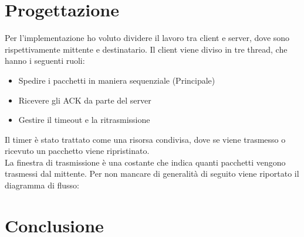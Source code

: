 \documentclass[a4paper,12pt]{report}
\begin{document}
\chapter{Progettazione}
Per l'implementazione ho voluto dividere il lavoro tra client e server,
dove sono rispettivamente mittente e destinatario. Il client viene diviso in tre thread,
che hanno i seguenti ruoli:
\begin{itemize}
  \item Spedire i pacchetti in maniera sequenziale (Principale)
  \item Ricevere gli ACK da parte del server
  \item Gestire il timeout e la ritrasmissione
\end{itemize}
Il timer è stato trattato come una risorsa condivisa, dove se viene trasmesso o ricevuto un pacchetto viene
ripristinato. \\
La finestra di trasmissione è una costante che indica quanti pacchetti vengono trasmessi dal mittente.
Per non mancare di generalità di seguito viene riportato il diagramma di flusso:


\chapter{Conclusione}
\end{document}
